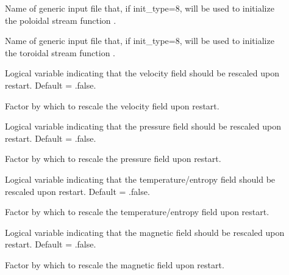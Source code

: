 \documentclass[letterpaper,11pt,english]{sphinxmanual}
\begin{document}
\begin{description}
\item[{}] \leavevmode
\sphinxAtStartPar
Name of generic input file that, if init\_type=8, will be used to initialize the poloidal stream function .

\item[{}] \leavevmode
\sphinxAtStartPar
Name of generic input file that, if init\_type=8, will be used to initialize the toroidal stream function .

\item[{}] \leavevmode
\sphinxAtStartPar
Logical variable indicating that the velocity field should be rescaled upon restart.  Default = .false.

\item[{}] \leavevmode
\sphinxAtStartPar
Factor by which to rescale the velocity field upon restart.

\item[{}] \leavevmode
\sphinxAtStartPar
Logical variable indicating that the pressure field should be rescaled upon restart.  Default = .false.

\item[{}] \leavevmode
\sphinxAtStartPar
Factor by which to rescale the pressure field upon restart.

\item[{}] \leavevmode
\sphinxAtStartPar
Logical variable indicating that the temperature/entropy field should be rescaled upon restart.  Default = .false.

\item[{}] \leavevmode
\sphinxAtStartPar
Factor by which to rescale the temperature/entropy field upon restart.

\item[{}] \leavevmode
\sphinxAtStartPar
Logical variable indicating that the magnetic field should be rescaled upon restart.  Default = .false.

\item[{}] \leavevmode
\sphinxAtStartPar
Factor by which to rescale the magnetic field upon restart.

\end{description}
\end{document}
